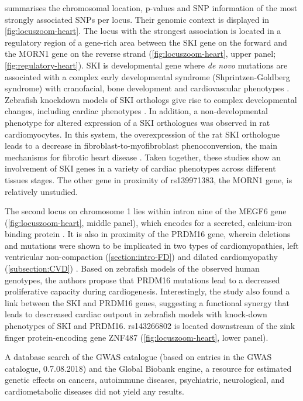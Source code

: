  summarises the chromosomal location, p-values and SNP information of the most strongly associated SNPs per locus. Their genomic context is displayed in \cref{fig:locuszoom-heart}. The locus with the strongest association is located in a regulatory region of a gene-rich area between the SKI gene on the forward and the MORN1 gene on the reverse strand (\cref{fig:locuszoom-heart}, upper panel; \cref{fig:regulatory-heart}). SKI is developmental gene where \textit{de novo} mutations are associated with a complex early developmental syndrome (Shprintzen-Goldberg syndrome) with cranofacial, bone development and cardiovascular phenotypes \citep{Greally2013}. Zebrafish knockdown models of SKI orthologs give rise to complex developmental changes, including cardiac phenotypes \citep{Doyle2012}. In addition, a non-developmental phenotype for altered expression of a SKI orthologues was observed in rat cardiomyocytes. In this system, the overexpression of the rat SKI orthologue leads to a decrease in fibroblast-to-myofibroblast phenoconversion, the main mechanisms for fibrotic heart disease \citep{Cunnington2010,Cunnington2014,Zeglinski2016}. Taken together, these studies show an involvement of SKI genes in a variety of cardiac phenotypes across different tissues stages. The other gene in proximity of rs139971383, the MORN1 gene, is relatively unstudied. 

The second locus on chromosome \num{1} lies within intron nine of the MEGF6 gene (\cref{fig:locuszoom-heart}, middle panel), which encodes for a secreted, calcium-iron binding protein \citep{Nakayama1998}. It is also in proximity of the PRDM16 gene, wherein deletions and mutations were shown to be implicated in two types of cardiomyopathies, left ventricular non-compaction (\cref{section:intro-FD}) and dilated cardiomyopathy  (\cref{subsection:CVD}) \citep{Arndt2013}. Based on zebrafish models of the observed human genotypes, the authors propose that PRDM16 mutations lead to a decreased proliferative capacity during cardiogenesis. Interestingly, the study also found a link between the SKI and PRDM16 genes, suggesting a functional synergy that leads to descreased cardiac outpout in zebrafish models with knock-down phenotypes of SKI and PRDM16. rs143266802 is located downstream of the zink finger protein-encoding gene ZNF487 (\cref{fig:locuszoom-heart}, lower panel).  

A database search of the GWAS catalogue \citep{MacArthur2017} (based on entries in the GWAS catalogue, 0.7.08.2018) and the Global Biobank engine, a resource for estimated genetic effects on cancers, autoimmune diseases, psychiatric, neurological, and cardiometabolic diseases \citep{BiobankEngine2017} did not yield any results. 


